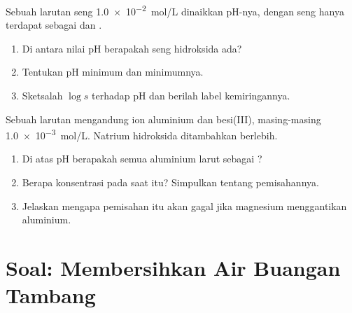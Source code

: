 \begin{exercise}[$\star\star\star$]\label{exo:b1:precipitation:11}
Sebuah larutan seng \qty{1.0e-2}{mol/L} dinaikkan pH-nya, dengan seng
hanya terdapat sebagai  dan .
\begin{enumerate}
  \item Di antara nilai pH berapakah seng hidroksida ada?
  \item Tentukan pH  minimum dan  minimumnya.
  \item Sketsalah $\log s$ terhadap pH dan berilah label kemiringannya.
\end{enumerate}
\end{exercise}

\begin{exercise}[$\star\star\star$]\label{exo:b1:precipitation:12}
Sebuah larutan mengandung ion aluminium dan besi(III), masing-masing
\qty{1.0e-3}{mol/L}. Natrium hidroksida ditambahkan berlebih.
\begin{enumerate}
  \item Di atas pH berapakah semua aluminium larut sebagai ?
  \item Berapa konsentrasi  pada saat itu? Simpulkan tentang
        pemisahannya.
  \item Jelaskan mengapa pemisahan itu akan gagal jika magnesium
        menggantikan aluminium.
\end{enumerate}
\end{exercise}

\section{Soal: Membersihkan Air Buangan Tambang}

